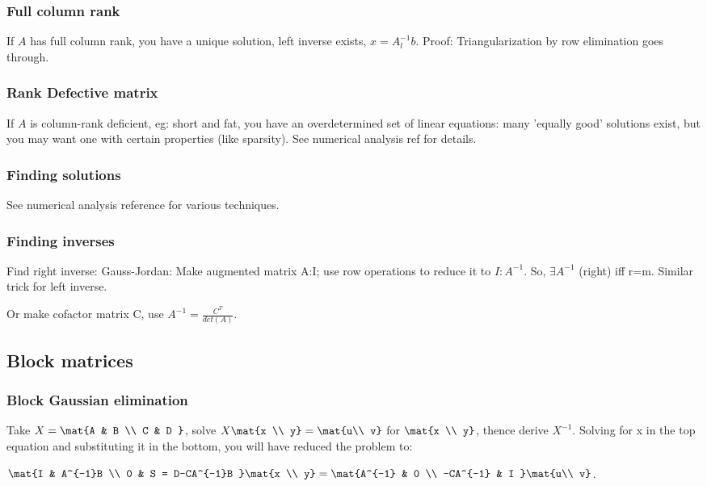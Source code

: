 \documentclass[oneside, article]{memoir}
\begin{document}
\subsubsection{Full column rank}
If $A$ has full column rank, you have a unique solution, left inverse exists, $x = A_l^{-1}b$. Proof: Triangularization by row elimination goes through.

\subsubsection{Rank Defective matrix}
If $A$ is column-rank deficient, eg: short and fat, you have an overdetermined set of linear equations: many 'equally good' solutions exist, but you may want one with certain properties (like sparsity). See numerical analysis ref for details.

\subsubsection{Finding solutions}
See numerical analysis reference for various techniques.

\subsubsection{Finding inverses}
Find right inverse: Gauss-Jordan: Make augmented matrix A:I; use row operations to reduce it to $I:A^{-1}$. So, $\exists A^{-1}$ (right) iff r=m. Similar trick for left inverse.

Or make cofactor matrix C, use $A^{-1} = \frac{C^{T}}{det(A)}$.

\subsection{Block matrices}
\subsubsection{Block Gaussian elimination}
Take $X = \mat{A & B \\ C & D }$, solve $X \mat{x \\ y} = \mat{u\\ v}$ for $\mat{x \\ y}$, thence derive $X^{-1}$. Solving for x in the top equation and substituting it in the bottom, you will have reduced the problem to:

$\mat{I & A^{-1}B \\ 0 & S = D-CA^{-1}B } \mat{x \\ y} = \mat{A^{-1} & 0 \\ -CA^{-1} & I } \mat{u\\ v}$.
\end{document}
